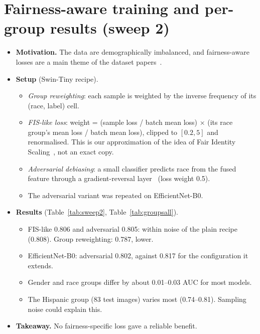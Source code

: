 \documentclass[11pt]{article}
\begin{document}
\section{Fairness-aware training and per-group results (sweep 2)}\label{app:fair}
\begin{itemize}
\item \textbf{Motivation.} The data are demographically imbalanced, and fairness-aware losses are a main theme of the dataset papers~\cite{harvardgf,harvardeye,fairdomain}.
\item \textbf{Setup} (Swin-Tiny recipe).
  \begin{itemize}
  \item \emph{Group reweighting}: each sample is weighted by the inverse frequency of its (race, label) cell.
  \item \emph{FIS-like loss}: weight = (sample loss / batch mean loss) $\times$ (its race group's mean loss / batch mean loss), clipped to $[0.2,5]$ and renormalised. This is our approximation of the idea of Fair Identity Scaling~\cite{harvardeye}, not an exact copy.
  \item \emph{Adversarial debiasing}: a small classifier predicts race from the fused feature through a gradient-reversal layer~\cite{grl} (loss weight 0.5).
  \item The adversarial variant was repeated on EfficientNet-B0.
  \end{itemize}
\item \textbf{Results} (Table~\ref{tab:sweep2}, Table~\ref{tab:groupsall}).
  \begin{itemize}
  \item FIS-like 0.806 and adversarial 0.805: within noise of the plain recipe (0.808). Group reweighting: 0.787, lower.
  \item EfficientNet-B0: adversarial 0.802, against 0.817 for the configuration it extends.
  \item Gender and race groups differ by about 0.01--0.03 AUC for most models.
  \item The Hispanic group (83 test images) varies most (0.74--0.81). Sampling noise could explain this.
  \end{itemize}
\item \textbf{Takeaway.} No fairness-specific loss gave a reliable benefit.
\end{itemize}

\begin{table}[h]
\centering\footnotesize
\setlength{\tabcolsep}{4pt}
\resizebox{\linewidth}{!}{}
\caption{Test AUC within demographic groups for representative models and 3-model ensembles.}
\label{tab:groupsall}
\end{table}
\end{document}
